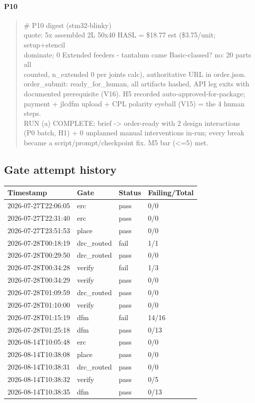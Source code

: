 \documentclass[11pt,a4paper]{article}
\begin{document}
\paragraph*{P10}
\begin{quote}\small\ttfamily\raggedright
\# P10 digest (stm32-blinky)\\
quote: 5x assembled 2L 50x40 HASL = \$18.77 est (\$3.75/unit; setup+stencil\\
dominate; 0 Extended feeders - tantalum came Basic-classed? no: 20 parts all\\
counted, n\_extended 0 per joints calc), authoritative URL in order.json.\\
order\_submit: ready\_for\_human, all artifacts hashed, API leg exits with\\
documented prerequisite (V16). H5 recorded auto-approved-for-package;\\
payment + jlcdfm upload + CPL polarity eyeball (V15) = the 4 human steps.\\
RUN (a) COMPLETE: brief -\textgreater{} order-ready with 2 design interactions\\
(P0 batch, H1) + 0 unplanned manual interventions in-run; every break\\
became a script/prompt/checkpoint fix. M5 bar (\textless{}=5) met.
\end{quote}
\subsection*{Gate attempt history}
{\small
\begin{longtable}{llll}
\toprule
\textbf{Timestamp} & \textbf{Gate} & \textbf{Status} & \textbf{Failing/Total} \\
\midrule
\endhead
2026-07-27T22:06:05 & erc & pass & 0/0 \\
2026-07-27T22:31:40 & erc & pass & 0/0 \\
2026-07-27T23:51:53 & place & pass & 0/0 \\
2026-07-28T00:18:19 & drc\_routed & fail & 1/1 \\
2026-07-28T00:29:50 & drc\_routed & pass & 0/0 \\
2026-07-28T00:34:28 & verify & fail & 1/3 \\
2026-07-28T00:34:29 & verify & pass & 0/0 \\
2026-07-28T01:09:59 & drc\_routed & pass & 0/0 \\
2026-07-28T01:10:00 & verify & pass & 0/0 \\
2026-07-28T01:15:19 & dfm & fail & 14/16 \\
2026-07-28T01:25:18 & dfm & pass & 0/13 \\
2026-08-14T10:05:48 & erc & pass & 0/0 \\
2026-08-14T10:38:08 & place & pass & 0/0 \\
2026-08-14T10:38:31 & drc\_routed & pass & 0/0 \\
2026-08-14T10:38:32 & verify & pass & 0/5 \\
2026-08-14T10:38:35 & dfm & pass & 0/13 \\
\bottomrule
\end{longtable}
}
\end{document}
